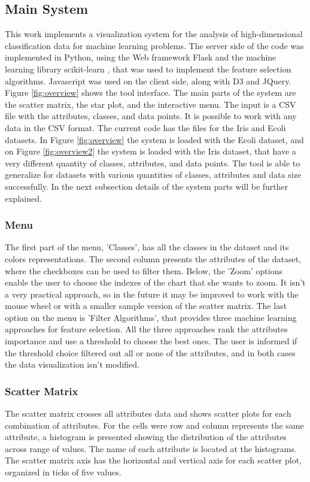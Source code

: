 \documentclass[journal]{IEEEtran}
\begin{document}
\subsection{Main System}
This work implements a visualization system for the analysis of high-dimensional classification data for machine learning problems. The server side of the code was implemented in Python, using the Web framework Flask \cite{flask} and the machine learning library scikit-learn \cite{sklearn}, that was used to implement the feature selection algorithms. Javascript was used on the client side, along with D3 \cite{d3} and JQuery. Figure \ref{fig:overview} shows the tool interface. The main parts of the system are the scatter matrix, the star plot, and the interactive menu. The input is a CSV file with the attributes, classes, and data points. It is possible to work with any data in the CSV format. The current code has the files for the Iris \cite{irisdataset} and Ecoli \cite{ecolidataset} datasets. In Figure \ref{fig:overview} the system is loaded with the Ecoli dataset, and on Figure \ref{fig:overview2} the system is loaded with the Iris dataset, that have a very different quantity of classes, attributes, and data points. The tool is able to generalize for datasets with various quantities of classes, attributes and data size successfully.  In the next subsection details of the system parts will be further explained.

\subsubsection{Menu}
The first part of the menu, 'Classes', has all the classes in the dataset and its colors representations. The second column presents the attributes of the dataset, where the checkboxes can be used to filter them. Below, the 'Zoom' options enable the user to choose the indexes of the chart that she wants to zoom. It isn't a very practical approach, so in the future it may be improved to work with the mouse wheel or with a smaller sample version of the scatter matrix. The last option on the menu is 'Filter Algorithms', that provides three machine learning approaches for feature selection. All the three approaches rank the attributes importance and use a threshold to choose the best ones. The user is informed if the threshold choice filtered out all or none of the attributes, and in both cases the data visualization isn't modified.

\subsubsection{Scatter Matrix}
The scatter matrix crosses all attributes data and shows scatter plots for each combination of attributes. For the cells were row and column represents the same attribute, a histogram is presented showing the distribution of the attributes across range of values. The name of each attribute is located at the histograms. The scatter matrix axis has the horizontal and vertical axis for each scatter plot, organized in ticks of five values.
\end{document}
